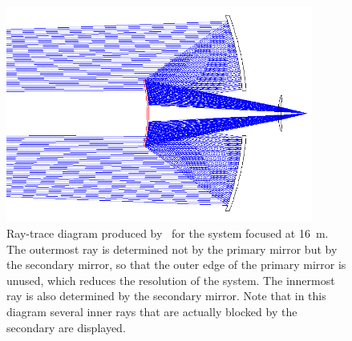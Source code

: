 \begin{figure}
\centering
\includegraphics[width=0.9\textwidth]{images/ch4-primary-ray-trace.png}
\caption[Optical system ray-trace diagram]{
Ray-trace diagram produced by \ZEMAX\ for the system focused at \SI{16}{\m}.
The outermost ray is determined not by the primary mirror but by the secondary mirror, so that the outer edge of the primary mirror is unused, which reduces the resolution of the system.
The innermost ray is also determined by the secondary mirror.
Note that in this diagram several inner rays that are actually blocked by the secondary are displayed.
}
\label{fig:ch4-primary-ray-trace}
\end{figure}

